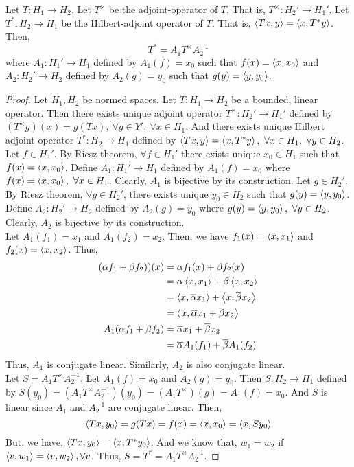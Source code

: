 \begin{remark}
	Let $T : H_1 \to H_2$.
	Let $T^\times$ be the adjoint-operator of $T$.
	That is, $T^\times : H_2' \to H_1'$.
	Let $T^\ast : H_2 \to H_1$ be the Hilbert-adjoint operator of $T$.
	That is, $\left\langle Tx,y \right\rangle = \left\langle x,T^\ast y \right\rangle$.
	Then,
	\[ T^\ast = A_1 T^\times A_2^{-1} \]
	where $A_1 : H_1' \to H_1$ defined by $A_1(f) = x_0$ such that $f(x) = \left\langle x,x_0 \right\rangle$ and $A_2 : H_2' \to H_2$ defined by $A_2(g) = y_0$ such that $g(y) = \left\langle y,y_0 \right\rangle$.

\end{remark}
\begin{proof}
	Let $H_1,H_2$ be normed spaces.
	Let $T : H_1 \to H_2$ be a bounded, linear operator.
	Then there exists unique adjoint operator $T^\times : H_2' \to H_1'$ defined by $(T^\times g)(x) = g(Tx),\ \forall g \in Y',\ \forall x \in H_1$.
	And there exists unique Hilbert adjoint operator $T^\ast : H_2 \to H_1$ defined by $\left\langle Tx,y \right\rangle = \left\langle x,T^\ast y \right\rangle,\ \forall x \in H_1,\ \forall y \in H_2$.\\

	Let $f \in H_1'$.
	By Riesz theorem, $\forall f \in H_1'$ there exists unique $x_0 \in H_1$ such that $f(x) = \left\langle x,x_0 \right\rangle$.
	Define $A_1 : H_1' \to H_1$ defined by $A_1(f) = x_0$ where $f(x) = \left\langle x,x_0 \right\rangle,\ \forall x \in H_1$.
	Clearly, $A_1$ is bijective by its construction.
	Let $g \in H_2'$.
	By Riesz theorem, $\forall g \in H_2'$, there exists unique $y_0 \in H_2$ such that $g(y) = \left\langle y,y_0 \right\rangle$.
	Define $A_2 : H_2' \to H_2$ defined by $A_2(g) = y_0$ where $g(y) = \left\langle y,y_0 \right\rangle,\ \forall y \in H_2$.
	Clearly, $A_2$ is bijective by its construction.\\

	Let $A_1(f_1) = x_1$ and $A_1(f_2) = x_2$.
	Then, we have $f_1(x) = \left\langle x,x_1 \right\rangle$ and $f_2(x) = \left\langle x,x_2 \right\rangle$.
	Thus,
	\begin{align*}
		(\alpha f_1 + \beta f_2))(x)
		& = \alpha f_1(x) + \beta f_2(x) \\
		& = \alpha \left\langle x,x_1 \right\rangle + \beta \left\langle x,x_2 \right\rangle \\
		& = \left\langle x,\overline{\alpha}x_1 \right\rangle + \left\langle x,\overline{\beta}x_2 \right\rangle \\
		& = \left\langle x,\overline{\alpha}x_1+\overline{\beta}x_2 \right\rangle\\
		A_1(\alpha f_1+\beta f_2) & = \overline{\alpha} x_1 + \overline{\beta}x_2 \\
		& = \overline{\alpha}A_1(f_1) + \overline{\beta}A_1(f_2)
	\end{align*}
	Thus, $A_1$ is conjugate linear.
	Similarly, $A_2$ is also conjugate linear.\\

	Let $S = A_1 T^\times A_2^{-1}$.
	Let $A_1(f) = x_0$ and $A_2(g) = y_0$.
	Then $S : H_2 \to H_1$ defined by $S(y_0) = (A_1 T^\times A_2^{-1})(y_0) = (A_1 T^\times) (g)  = A_1(f) = x_0$.
	And $S$ is linear since $A_1$ and $A_2^{-1}$ are conjugate linear.
	Then,
	\[ \left\langle Tx,y_0 \right\rangle = g(Tx) = f(x) = \left\langle x,x_0 \right\rangle =  \left\langle x,S y_0 \right\rangle \]
	But, we have, $\left\langle Tx,y_0 \right\rangle = \left\langle x,T^\ast y_0 \right\rangle$.
	And we know that, $w_1 = w_2$ if $\left\langle v,w_1 \right\rangle = \left\langle v,w_2 \right\rangle, \forall v$.
	Thus, $S = T^\ast = A_1 T^\times A_2^{-1}$.
\end{proof}

